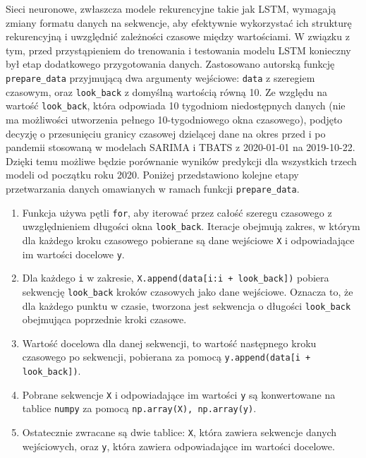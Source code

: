 \documentclass[polish, twoside, 12pt, a4paper]{article}
\theoremstyle{definition}
\theoremstyle{plain}
\theoremstyle{remark}
\newcommand{\code}[1]{\lstinline{#1}}
\begin{document}
Sieci neuronowe, zwłaszcza modele rekurencyjne takie jak LSTM, wymagają zmiany formatu danych na sekwencje, aby efektywnie wykorzystać ich strukturę rekurencyjną i uwzględnić zależności czasowe między wartościami. W związku z tym, przed przystąpieniem do trenowania i testowania modelu LSTM konieczny był etap dodatkowego przygotowania danych. Zastosowano autorską funkcję \code{prepare_data} przyjmującą dwa argumenty wejściowe: \code{data} z szeregiem czasowym, oraz \code{look_back} z domyślną wartością równą 10. Ze względu na wartość \code{look_back}, która odpowiada 10 tygodniom niedostępnych danych (nie ma możliwości utworzenia pełnego 10-tygodniowego okna czasowego), podjęto decyzję o przesunięciu granicy czasowej dzielącej dane na okres przed i po pandemii stosowaną w modelach SARIMA i TBATS z 2020-01-01 na 2019-10-22. Dzięki temu możliwe będzie porównanie wyników predykcji dla wszystkich trzech modeli od początku roku 2020. Poniżej przedstawiono kolejne etapy przetwarzania danych omawianych w ramach funkcji \code{prepare_data}.
\begin{enumerate}[label=\arabic*.,noitemsep]
	\item Funkcja używa pętli \code{for}, aby iterować przez całość szeregu czasowego z uwzględnieniem długości okna \code{look_back}. Iteracje obejmują zakres, w którym dla każdego kroku czasowego pobierane są dane wejściowe \code{X} i odpowiadające im wartości docelowe \code{y}.
	\item Dla każdego \code{i} w zakresie, \code{X.append(data[i:i + look_back])} pobiera sekwencję \code{look_back} kroków czasowych jako dane wejściowe. Oznacza to, że dla każdego punktu w czasie, tworzona jest sekwencja o długości \code{look_back} obejmująca poprzednie kroki czasowe.
	\item Wartość docelowa dla danej sekwencji, to wartość następnego kroku czasowego po sekwencji, pobierana za pomocą \code{y.append(data[i + look_back])}.
	\item Pobrane sekwencje \code{X} i odpowiadające im wartości \code{y} są konwertowane na tablice \code{numpy} za pomocą \code{np.array(X), np.array(y)}.
	\item Ostatecznie zwracane są dwie tablice: \code{X}, która zawiera sekwencje danych wejściowych, oraz \code{y}, która zawiera odpowiadające im wartości docelowe.
\end{enumerate}
\end{document}
